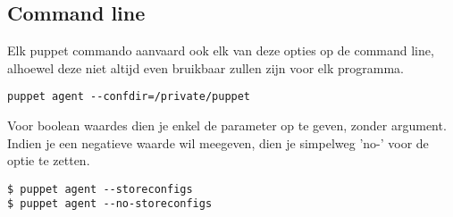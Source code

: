 \subsection{Command line}
Elk puppet commando aanvaard ook elk van deze opties op de command line, alhoewel deze niet altijd even bruikbaar zullen zijn voor elk programma.
\begin{code}
\begin{lstlisting}
puppet agent --confdir=/private/puppet
\end{lstlisting}
\end{code}
%
Voor boolean waardes dien je enkel de parameter op te geven, zonder argument. Indien je een negatieve waarde wil meegeven, dien je simpelweg 'no-' voor de optie te zetten.
\begin{code}
\begin{lstlisting}
$ puppet agent --storeconfigs
$ puppet agent --no-storeconfigs
\end{lstlisting}
\end{code}
